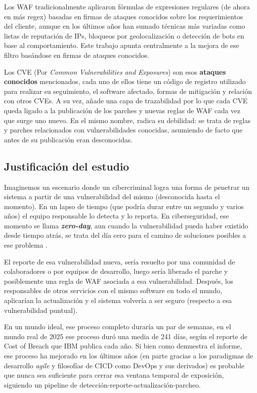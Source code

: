 \documentclass[12pt, a4paper]{article}
\begin{document}
Los WAF tradicionalmente aplicaron fórmulas de expresiones regulares (de ahora en más regex) basadas en firmas de ataques conocidos sobre los requerimientos del cliente, aunque en los últimos años han sumado técnicas más variadas como listas de reputación de IPs, bloqueos por geolocalización o detección de bots en base al comportamiento. Este trabajo apunta centralmente a la mejora de ese filtro basándose en firmas de ataques conocidos.

Los CVE (Por \textit{Common Vulnerabilities and Exposures}) son esos \textbf{ataques conocidos} mencionados, cada uno de ellos tiene un código de registro utilizado para realizar su seguimiento, el software afectado, formas de mitigación y relación con otros CVEs. A su vez, añade una capa de trazabilidad por lo que cada CVE queda ligado a la publicación de los parches y nuevas reglas de WAF cada vez que surge uno nuevo. En el mismo nombre, radica su debilidad: se trata de reglas y parches relacionados con vulnerabilidades conocidas, asumiendo de facto que antes de su publicación eran desconocidas.

\subsection{Justificación del estudio}
\label{sec:justificacion-estudio}

Imaginemos un escenario donde un cibercriminal logra una forma de penetrar un sistema a partir de una vulnerabilidad del mismo (desconocida hasta el momento). En un lapso de tiempo (que podría durar entre un segundo y varios años) el equipo responsable lo detecta y lo reporta. En ciberseguridad, ese momento se llama \textbf{\textit{zero-day}}, aun cuando la vulnerabilidad pueda haber existido desde tiempo atrás, se trata del día cero para el camino de soluciones posibles a ese problema \cite{nist_zeroday_attack}.

El reporte de esa vulnerabilidad nueva, sería resuelto por una comunidad de colaboradores o por equipos de desarrollo, luego sería liberado el parche y posiblemente una regla de WAF asociada a esa vulnerabilidad. Después, los responsables de otros servicios con el mismo software en todo el mundo, aplicarían la actualización y el sistema volvería a ser seguro (respecto a esa vulnerabilidad puntual).

En un mundo ideal, ese proceso completo duraría un par de semanas, en el mundo real de 2025 ese proceso duró una media de 241 días, según el reporte de Cost of Breach que IBM publica cada año\cite{ibm_databreach_2025}. Si bien como demuestra el informe, ese proceso ha mejorado en los últimos años (en parte gracias a los paradigmas de desarrollo \textit{agile} y filosofías de CICD como DevOps y sus derivados) es probable que nunca sea suficiente para cerrar esa ventana temporal de exposición, siguiendo un pipeline de detección-reporte-actualización-parcheo.
\end{document}
